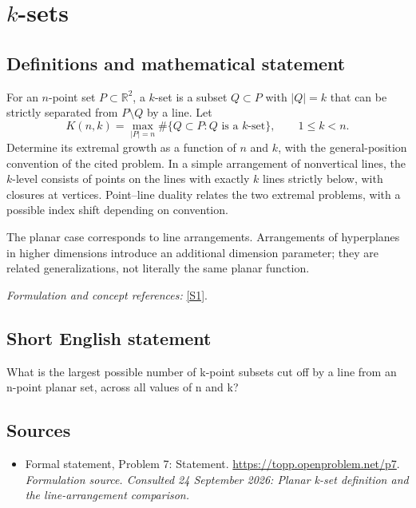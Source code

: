 \documentclass[11pt]{article}
\begin{document}
\section*{\texorpdfstring{$k$-sets}{\$k\$-sets}}\label{5500007}
\subsection{Definitions and mathematical statement}
For an $n$-point set $P\subset{\mathbb{R}}^2$, a $k$-set is a subset $Q\subset P$ with $|Q|=k$ that can be strictly separated from $P\setminus Q$ by a line. Let
\[
 K(n,k)=\max_{|P|=n}\#\{Q\subset P:Q\text{ is a }k\text{-set}
                                      \},\qquad1\le k<n.
\]
Determine its extremal growth as a function of $n$ and $k$, with the general-position convention of the cited problem. In a simple arrangement of nonvertical lines, the $k$-level consists of points on the lines with exactly $k$ lines strictly below, with closures at vertices. Point--line duality relates the two extremal problems, with a possible index shift depending on convention.

The planar case corresponds to line arrangements. Arrangements of hyperplanes in higher dimensions introduce an additional dimension parameter; they are related generalizations, not literally the same planar function.
\par\smallskip\textit{Formulation and concept references:} \href{https://topp.openproblem.net/p7}{[S1]}.

\subsection{Short English statement}
What is the largest possible number of k-point subsets cut off by a line from an n-point planar set, across all values of n and k?
\subsection{Sources}
\begin{itemize}
\item[S1]Formal statement, Problem 7: Statement.
\url{https://topp.openproblem.net/p7}.
\textit{Formulation source. Consulted 24 September 2026: Planar k-set definition and the line-arrangement comparison.}
\end{itemize}
\end{document}
